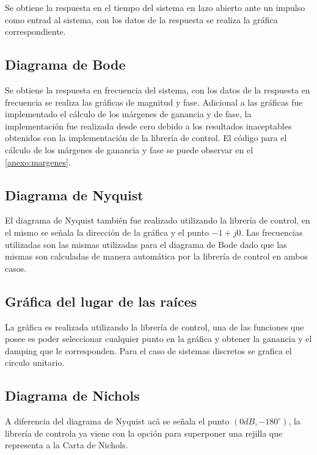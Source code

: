         Se obtiene la respuesta en el tiempo del sistema en lazo abierto ante un impulso como entrad al sistema, con los datos de la respuesta se realiza la gráfica correspondiente.

    \subsection{Diagrama de Bode}
        
        Se obtiene la respuesta en frecuencia del sistema, con los datos de la respuesta en frecuencia se realiza las gráficas de magnitud y fase. Adicional a las gráficas fue implementado el cálculo de los márgenes de ganancia y de fase, la implementación fue realizada desde cero debido a los resultados inaceptables obtenidos con la implementación de la librería de control. El código para el cálculo de los márgenes de ganancia y fase se puede observar en el \ref{anexo:margenes}.
    
    \subsection{Diagrama de Nyquist}
        
        El diagrama de Nyquist también fue realizado utilizando la librería de control, en el mismo se señala la dirección de la gráfica y el punto $-1 + j0$. Las frecuencias utilizadas son las mismas utilizadas para el diagrama de Bode dado que las mismas son calculadas de manera automática por la librería de control en ambos casos.
    
    \subsection{Gráfica del lugar de las raíces}
        
        La gráfica es realizada utilizando la librería de control, una de las funciones que posee es poder seleccionar cualquier punto en la gráfica y obtener la ganancia y el damping que le corresponden. Para el caso de sistemas discretos se grafica el circulo unitario.
    
    \subsection{Diagrama de Nichols}
        
        A diferencia del diagrama de Nyquist acá se señala el punto $(0dB, -180^\circ)$, la librería de controla ya viene con la opción para superponer una rejilla que representa a la Carta de Nichols.

